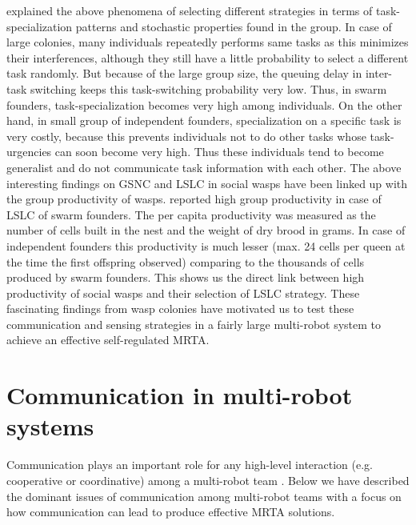 \documentclass{intech}
\begin{document}
\cite{Jeanne1999} explained the above phenomena of selecting different strategies in terms of task-specialization patterns and stochastic properties found in the group. In case of large colonies, many individuals repeatedly performs same tasks as this minimizes their interferences, although they still have a little probability to select a different task randomly. But because of the large group size, the queuing delay in inter-task switching keeps this task-switching probability very low. Thus, in swarm founders, task-specialization becomes very high among individuals. On the other hand, in small group of independent founders, specialization on a specific task is very costly, because this prevents individuals not to do other tasks whose task-urgencies can soon become very high. Thus these individuals tend to become generalist and do not communicate task information with each other.
The above interesting findings on GSNC and LSLC in social wasps have been linked up with  the group productivity of wasps. \cite{Jeanne1999} reported high group productivity in case of LSLC of swarm founders. The per capita productivity was measured as the number of cells built in the nest and the weight of dry brood in grams. In case of independent founders this productivity is much lesser (max. 24 cells per queen at the time the first offspring observed) comparing to the thousands of cells produced by swarm founders.  This shows  us the direct link between high productivity of social wasps and their selection of LSLC strategy. These fascinating findings from wasp colonies have motivated us to test these communication and sensing strategies in a fairly large multi-robot system to achieve an effective self-regulated MRTA.
\section{Communication in multi-robot systems}
\label{mrs-comm}
\label{bg:mrs-comm}
Communication plays an important role for any high-level interaction (e.g. cooperative or coordinative) among a multi-robot team \cite{Arkin1998}. %
Below we have described the dominant issues of communication among multi-robot teams with a focus on how communication  can lead to produce effective MRTA solutions.
\end{document}
